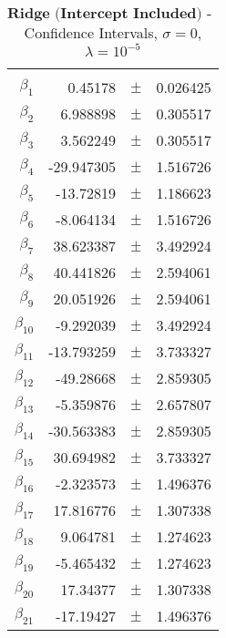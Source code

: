 \documentclass[...,numrefs]{wiley-article}
\begin{document}
\begin{table}[h]
    \centering
    \caption{$\textbf{Ridge (Intercept Included) - Franke Function:}$ Confidence Intervals, $\sigma = 0$, $\lambda = 10^{-5}$}
    \begin{tabular}{rrrr}
    \hline
    \\
    $\beta_{1}$ & 0.45178 & $\pm$ & 0.026425 \\
    $\beta_{2}$ & 6.988898 & $\pm$ & 0.305517 \\
    $\beta_{3}$ & 3.562249 & $\pm$ & 0.305517 \\
    $\beta_{4}$ & -29.947305 & $\pm$ & 1.516726 \\
    $\beta_{5}$ & -13.72819 & $\pm$ & 1.186623 \\
    $\beta_{6}$ & -8.064134 & $\pm$ & 1.516726 \\
    $\beta_{7}$ & 38.623387 & $\pm$ & 3.492924 \\
    $\beta_{8}$ & 40.441826 & $\pm$ & 2.594061 \\
    $\beta_{9}$ & 20.051926 & $\pm$ & 2.594061 \\
    $\beta_{10}$ & -9.292039 & $\pm$ & 3.492924 \\
    $\beta_{11}$ & -13.793259 & $\pm$ & 3.733327 \\
    $\beta_{12}$ & -49.28668 & $\pm$ & 2.859305 \\
    $\beta_{13}$ & -5.359876 & $\pm$ & 2.657807 \\
    $\beta_{14}$ & -30.563383 & $\pm$ & 2.859305 \\
    $\beta_{15}$ & 30.694982 & $\pm$ & 3.733327 \\
    $\beta_{16}$ & -2.323573 & $\pm$ & 1.496376 \\
    $\beta_{17}$ & 17.816776 & $\pm$ & 1.307338 \\
    $\beta_{18}$ & 9.064781 & $\pm$ & 1.274623 \\
    $\beta_{19}$ & -5.465432 & $\pm$ & 1.274623 \\
    $\beta_{20}$ & 17.34377 & $\pm$ & 1.307338 \\
    $\beta_{21}$ & -17.19427 & $\pm$ & 1.496376 \\
    \hline
    \end{tabular}

    \label{tab:my_label}
\end{table}
\end{document}
